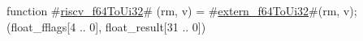 function #\hyperref[sailRISCVzriscvzyf64ToUi32]{riscv\_f64ToUi32}# (rm, v) = {
  #\hyperref[sailRISCVzexternzyf64ToUi32]{extern\_f64ToUi32}#(rm, v);
  (float_fflags[4 .. 0], float_result[31 .. 0])
}
